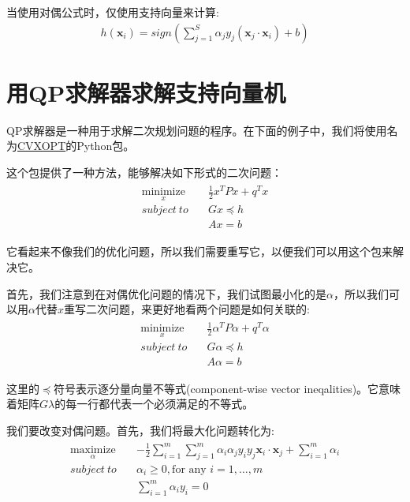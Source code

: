 当使用对偶公式时，仅使用支持向量来计算:
\begin{gather*}
h(\mathbf{x}_i) = sign(\sum_{j=1}^S \alpha_j y_j (\mathbf{x}_j \cdot \mathbf{x}_i)+b)
\end{gather*}


\section{用QP求解器求解支持向量机}

QP求解器是一种用于求解二次规划问题的程序。在下面的例子中，我们将使用名为\href{http://cvxopt.org/}{CVXOPT}的Python包。

这个包提供了一种方法，能够解决如下形式的二次问题：
\begin{gather*}
\begin{align*}
\underset{x}{\text{minimize}} \quad & \frac{1}{2}x^T P x+q^T x \\
subject\ to \quad &Gx \preceq h \\
& Ax = b
\end{align*}
\end{gather*}

它看起来不像我们的优化问题，所以我们需要重写它，以便我们可以用这个包来解决它。

首先，我们注意到在对偶优化问题的情况下，我们试图最小化的是$\alpha$，所以我们可以用$\alpha$代替$x$重写二次问题，来更好地看两个问题是如何关联的:
\begin{gather*}
\begin{align*}
\underset{x}{\text{minimize}} \quad & \frac{1}{2}\alpha^T P \alpha+q^T \alpha \\
subject\ to \quad &G \alpha \preceq h \\
& A \alpha = b
\end{align*}
\end{gather*}

这里的$\preceq$符号表示逐分量向量不等式(component-wise vector ineqalities)。它意味着矩阵$G \lambda$的每一行都代表一个必须满足的不等式。

我们要改变对偶问题。首先，我们将最大化问题转化为:
\begin{gather*}
\begin{align*}
\underset{\alpha}{\text{maximize}} \quad & - \frac{1}{2}\sum_{i=1}^m\sum_{j=1}^m \alpha_i \alpha_j y_i y_j \mathbf{x}_i \cdot \mathbf{x}_j + \sum_{i=1}^m \alpha_i \\
subject\ to \quad & \alpha_i \geq 0,\text{for any }i=1,\dots,m \\
& \sum_{i=1}^m \alpha_i y_i = 0
\end{align*}
\end{gather*}

